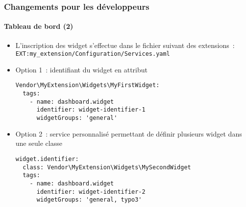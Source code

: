 
\begin{frame}[fragile]
	\frametitle{Changements pour les développeurs}
	\framesubtitle{Tableau de bord (2)}

	\lstset{basicstyle=\tiny\ttfamily}

	\begin{itemize}
		\item L'inscription des widget s'effectue dans le fichier suivant des extensions~:\newline
			\texttt{EXT:my\_extension/Configuration/Services.yaml}

		\item Option 1~: identifiant du widget en attribut

\vspace{-0.4cm}
\begin{lstlisting}
Vendor\MyExtension\Widgets\MyFirstWidget:
  tags:
    - name: dashboard.widget
      identifier: widget-identifier-1
      widgetGroups: 'general'
\end{lstlisting}

		\item Option 2~: service personnalisé permettant de définir plusieurs widget
			dans une seule classe

\vspace{-0.4cm}
\begin{lstlisting}
widget.identifier:
  class: Vendor\MyExtension\Widgets\MySecondWidget
  tags:
    - name: dashboard.widget
      identifier: widget-identifier-2
      widgetGroups: 'general, typo3'
\end{lstlisting}

	\end{itemize}

\end{frame}



